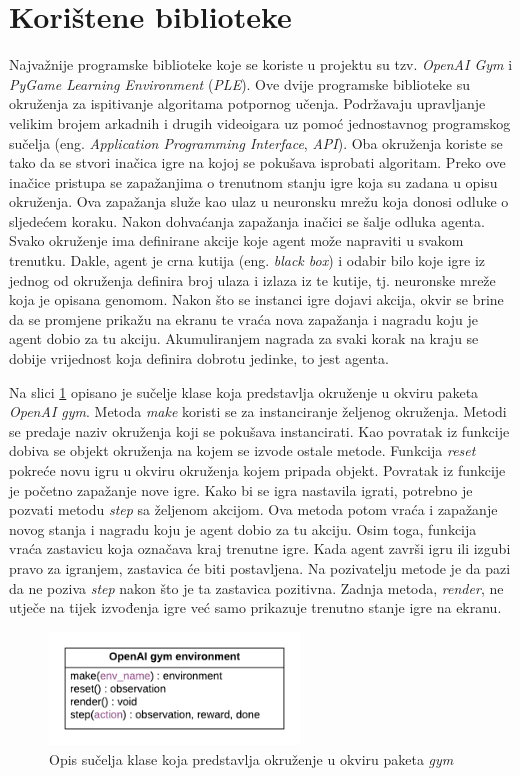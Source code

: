 \documentclass[times, utf8, diplomski, numeric]{fer}
\begin{document}
\section{Korištene biblioteke}
Najvažnije programske biblioteke koje se koriste u projektu su tzv. \textit{OpenAI Gym} i \textit{PyGame Learning Environment} (\textit{PLE}). Ove dvije programske biblioteke su okruženja za ispitivanje algoritama potpornog učenja. Podržavaju upravljanje velikim brojem arkadnih i drugih videoigara uz pomoć jednostavnog programskog sučelja (eng. \textit{Application Programming Interface}, \textit{API}). Oba okruženja koriste se tako da se stvori inačica igre na kojoj se pokušava isprobati algoritam. Preko ove inačice pristupa se zapažanjima o trenutnom stanju igre koja su zadana u opisu okruženja. Ova zapažanja služe kao ulaz u neuronsku mrežu koja donosi odluke o sljedećem koraku. Nakon dohvaćanja zapažanja inačici se šalje odluka agenta. Svako okruženje ima definirane akcije koje agent može napraviti u svakom trenutku. Dakle, agent je crna kutija (eng. \textit{black box}) i odabir bilo koje igre iz jednog od okruženja definira broj ulaza i izlaza iz te kutije, tj. neuronske mreže koja je opisana genomom. Nakon što se instanci igre dojavi akcija, okvir se brine da se promjene prikažu na ekranu te vraća nova zapažanja i nagradu koju je agent dobio za tu akciju. Akumuliranjem nagrada za svaki korak na kraju se dobije vrijednost koja definira dobrotu jedinke, to jest agenta.

Na slici \ref{slika20} opisano je sučelje klase koja predstavlja okruženje u okviru paketa \textit{OpenAI gym}. Metoda \textit{make} koristi se za instanciranje željenog okruženja. Metodi se predaje naziv okruženja koji se pokušava instancirati. Kao povratak iz funkcije dobiva se objekt okruženja na kojem se izvode ostale metode. Funkcija \textit{reset} pokreće novu igru u okviru okruženja kojem pripada objekt. Povratak iz funkcije je početno zapažanje nove igre. Kako bi se igra nastavila igrati, potrebno je pozvati metodu \textit{step} sa željenom akcijom. Ova metoda potom vraća i zapažanje novog stanja i nagradu koju je agent dobio za tu akciju. Osim toga, funkcija vraća zastavicu koja označava kraj trenutne igre. Kada agent završi igru ili izgubi pravo za igranjem, zastavica će biti postavljena. Na pozivatelju metode je da pazi da ne poziva \textit{step} nakon što je ta zastavica pozitivna. Zadnja metoda, \textit{render}, ne utječe na tijek izvođenja igre već samo prikazuje trenutno stanje igre na ekranu.

\begin{figure}
  \centering
  \includegraphics[height=3cm]{slika20}
  \caption{Opis sučelja klase koja predstavlja okruženje u okviru paketa \textit{gym}}
  \label{slika20}
\end{figure}
\end{document}
